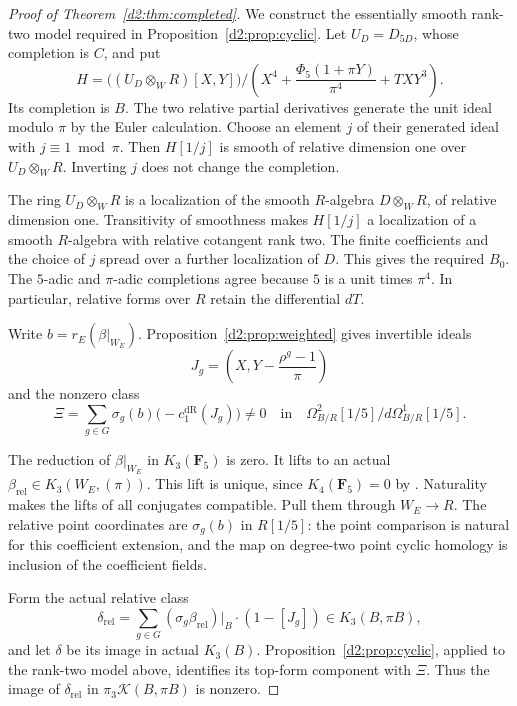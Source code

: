 \documentclass[11pt,a4paper]{amsart}
\numberwithin{equation}{section}
\theoremstyle{definition}
\theoremstyle{remark}
\newcommand{\DtwoFF}{\mathbf{F}}
\newcommand{\DtwocK}{\mathcal K}
\newcommand{\DtwodR}{\mathrm{dR}}
\begin{document}
\begin{proof}[Proof of Theorem~\ref{d2:thm:completed}]
We construct the essentially smooth rank-two model required in
Proposition~\ref{d2:prop:cyclic}.
Let \(U_D=D_{5D}\), whose completion is \(C\), and put
\[
 H=
 \bigl((U_D\otimes_WR)[X,Y]\bigr)/
 \left(X^4+\frac{\Phi_5(1+\pi Y)}{\pi^4}+TXY^3\right).
\]
Its completion is \(B\).
The two relative partial derivatives generate the unit ideal
modulo \(\pi\) by the Euler calculation.
Choose an element \(j\) of their generated ideal with
\(j\equiv1\bmod\pi\).
Then \(H[1/j]\) is smooth of relative dimension one over
\(U_D\otimes_WR\).
Inverting \(j\) does not change the completion.

The ring \(U_D\otimes_WR\) is a localization of the smooth
\(R\)-algebra \(D\otimes_WR\), of relative dimension one.
Transitivity of smoothness makes \(H[1/j]\) a localization of a
smooth \(R\)-algebra with relative cotangent rank two.
The finite coefficients and the choice of \(j\) spread over a
further localization of \(D\).
This gives the required \(B_0\).
The \(5\)-adic and \(\pi\)-adic completions agree because \(5\)
is a unit times \(\pi^4\).
In particular, relative forms over \(R\) retain the differential
\(dT\).

Write \(b=r_E(\beta|_{W_E})\).
Proposition~\ref{d2:prop:weighted} gives invertible ideals
\[
 J_g=\left(X,Y-\frac{\rho^g-1}{\pi}\right)
\]
and the nonzero class
\begin{equation}\label{d2:eq:completed-form}
 \Xi=\sum_{g\in G}\sigma_g(b)\bigl(-c_1^\DtwodR(J_g)\bigr)
 \ne0
 \quad\text{in}\quad
 \Omega^2_{B/R}[1/5]\big/d\Omega^1_{B/R}[1/5].
\end{equation}

The reduction of \(\beta|_{W_E}\) in \(K_3(\DtwoFF_5)\) is zero.
It lifts to an actual
\(\beta_{\mathrm{rel}}\in K_3(W_E,(\pi))\).
This lift is unique, since \(K_4(\DtwoFF_5)=0\) by
\cite{QuillenFinite}\cite[IV, Corollary~1.13]{Weibel}.
Naturality makes the lifts of all conjugates compatible.
Pull them through \(W_E\to R\).
The relative point coordinates are \(\sigma_g(b)\) in \(R[1/5]\):
the point comparison is natural for this coefficient extension,
and the map on degree-two point cyclic homology is inclusion of
the coefficient fields.

Form the actual relative class
\[
 \delta_{\mathrm{rel}}
   =\sum_{g\in G}
      (\sigma_g\beta_{\mathrm{rel}})|_B\cdot(1-[J_g])
       \in K_3(B,\pi B),
\]
and let \(\delta\) be its image in actual \(K_3(B)\).
Proposition~\ref{d2:prop:cyclic}, applied to the rank-two model above,
identifies its top-form component with \(\Xi\).
Thus the image of \(\delta_{\mathrm{rel}}\) in
\(\pi_3\DtwocK(B,\pi B)\) is nonzero.


\end{proof}
\end{document}
